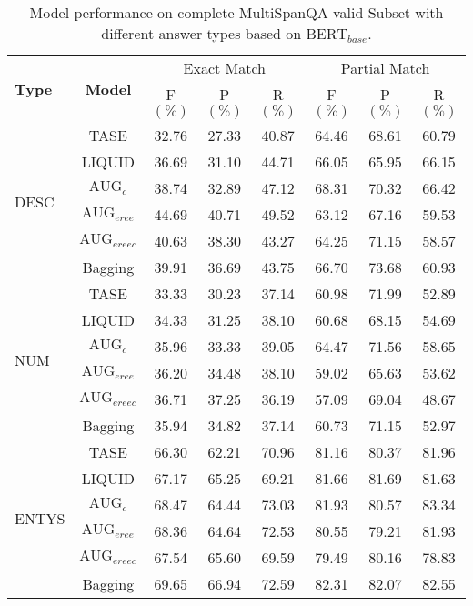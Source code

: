 \begin{table*}[ht]
	\caption{Model performance on complete MultiSpanQA valid Subset with different answer types based on $\text{BERT}_{base}$.}
	\label{tab:bertsub}
	\begin{tabular*}{\textwidth}{@{\extracolsep{\fill}}lccccccc}
		\toprule
		\multirow{2}{*}{\textbf{Type}} & \multirow{2}{*}{\textbf{Model}} & \multicolumn{3}{c}{Exact Match} & \multicolumn{3}{c}{Partial Match} \\
		\cmidrule{3-8} 
		& & F\((\%)\) & P\((\%)\) & R\((\%)\) & F\((\%)\) & P\((\%)\) & R\((\%)\) \\
		\midrule
		\multirow{6}{*}{DESC} & TASE & 32.76 & 27.33 & 40.87 & 64.46 & 68.61 & 60.79 \\ 
		& LIQUID & 36.69 & 31.10 & 44.71 & 66.05 & 65.95 & 66.15 \\
		& $\text{AUG}_{c}$ & 38.74 & 32.89 & 47.12 & 68.31 & 70.32 & 66.42 \\
		& $\text{AUG}_{eree}$ & 44.69 & 40.71 & 49.52 & 63.12 & 67.16 & 59.53 \\
		& $\text{AUG}_{ereec}$ & 40.63 & 38.30 & 43.27 & 64.25 & 71.15 & 58.57 \\
		& Bagging & 39.91 & 36.69 & 43.75 & 66.70 & 73.68 & 60.93 \\
		\midrule
		\multirow{6}{*}{NUM} & TASE & 33.33 & 30.23 & 37.14 & 60.98 & 71.99 & 52.89 \\ 
		& LIQUID & 34.33 & 31.25 & 38.10 & 60.68 & 68.15 & 54.69 \\
		& $\text{AUG}_{c}$ & 35.96 & 33.33 & 39.05 & 64.47 & 71.56 & 58.65 \\
		& $\text{AUG}_{eree}$ & 36.20 & 34.48 & 38.10 & 59.02 & 65.63 & 53.62 \\
		& $\text{AUG}_{ereec}$ & 36.71 & 37.25 & 36.19 & 57.09 & 69.04 & 48.67 \\
		& Bagging & 35.94 & 34.82 & 37.14 & 60.73 & 71.15 & 52.97 \\
		\midrule
		\multirow{6}{*}{ENTYS} & TASE & 66.30 & 62.21 & 70.96 & 81.16 & 80.37 & 81.96 \\ 
		& LIQUID & 67.17 & 65.25 & 69.21 & 81.66 & 81.69 & 81.63 \\
		& $\text{AUG}_{c}$ & 68.47 & 64.44 & 73.03 & 81.93 & 80.57 & 83.34 \\
		& $\text{AUG}_{eree}$ & 68.36 & 64.64 & 72.53 & 80.55 & 79.21 & 81.93 \\
		& $\text{AUG}_{ereec}$ & 67.54 & 65.60 & 69.59 & 79.49 & 80.16 & 78.83 \\
		& Bagging & 69.65 & 66.94 & 72.59 & 82.31 & 82.07 & 82.55 \\
		\bottomrule
	\end{tabular*}
\end{table*}

